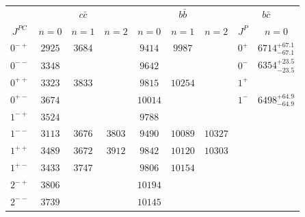 \begin{table}[!t]
\renewcommand{\arraystretch}{1.3}
\begin{center}
\begin{tabular}{c|ccc|ccc||c|c}
\hline
\hline
            & \multicolumn{3}{c|}{$c\bar{c}   $}   & \multicolumn{3}{c||}{$b\bar{b}$}    & \multicolumn{2}{c}{$b\bar{c}$}                                         \\
$J^{PC}$    & $n=0$   & $n=1$  & $n=2$  & $n=0$   & $n=1$  & $n=2$  &  $J^{P}$ &    $n=0$                               \\
\hline                                                                                                                                                                                                     
$0^{-+}$    & $2925$  & $3684$ &        & $9414$  & $9987$ &    	&   $0^{+}$     &   $6714^{+67.1}_{-67.1}$           \\
$0^{--}$    & $3348$  &        &        & $9642$  &        &    	&   $0^{-}$   &     $6354^{+23.5}_{-23.5}$    \\
$0^{++}$    & $3323$  & $3833$ &        & $9815$  & $10254$&    	&  $1^{+}$   &                         \\
$0^{+-}$    & $3674$  &        &        & $10014$ &        &     	&  $1^{-}$  &     $6498^{+64.9}_{-64.9}$                                 \\
\hline                                                                                                                                                                                                     
$1^{-+}$    & $3524$  &        &        & $9788$  &        &    	&       &                 \\
$1^{--}$    & $3113$  & $3676$ & $3803$ & $9490$  & $10089$& $10327$&       &               \\ 
$1^{++}$    & $3489$  & $3672$ & $3912$ & $9842$  & $10120$& $10303$&       &               \\
$1^{+-}$    & $3433$  & $3747$ &        & $9806$  & $10154$&    	&       &                    \\
\hline                                                                                                                                                                                                     
$2^{-+}$    & $3806$  &        &        & $10194$  &        &    	&      &                                 \\
$2^{--}$    & $3739$  &        &        & $10145$  &        &    	&      &                                              \\

\end{tabular}
\end{center}
\end{table}
